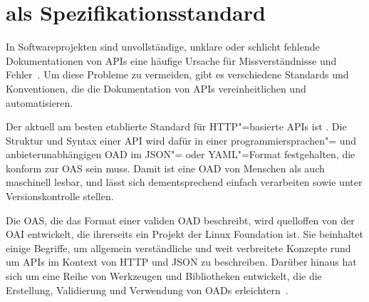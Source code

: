 \chapter{\OA als Spezifikationsstandard} \label{ch:openapi}
In Softwareprojekten sind unvollständige, unklare oder schlicht fehlende Dokumentationen von \acp{API} eine häufige Ursache für Missverständnisse und Fehler~\cite{ope23a}.
Um diese Probleme zu vermeiden, gibt es verschiedene Standards und Konventionen, die die Dokumentation von \acp{API} vereinheitlichen und automatisieren.

Der aktuell am besten etablierte Standard für \ac{HTTP}"=basierte \acp{API} ist \OA\@.
Die Struktur und Syntax einer \ac{API} wird dafür in einer programmiersprachen"= und anbieterunabhängigen \ac{OAD} im \acs{JSON}"= oder \acs{YAML}"=Format festgehalten, die konform zur \ac{OAS} sein muss.
Damit ist eine \ac{OAD} von Menschen als auch maschinell lesbar, und lässt sich dementsprechend einfach verarbeiten sowie unter Versionskontrolle stellen.

Die \ac{OAS}, die das Format einer validen \ac{OAD} beschreibt, wird quelloffen von der \ac{OAI} entwickelt, die ihrerseits ein Projekt der Linux Foundation ist.
Sie beinhaltet einige Begriffe, um allgemein verständliche und weit verbreitete Konzepte rund um \acp{API} im Kontext von \acs{HTTP} und \acs{JSON} zu beschreiben.
Darüber hinaus hat sich um \OA eine Reihe von Werkzeugen und Bibliotheken entwickelt, die die Erstellung, Validierung und Verwendung von \acp{OAD} erleichtern~\cites{ope,ope23,ope23a}.

